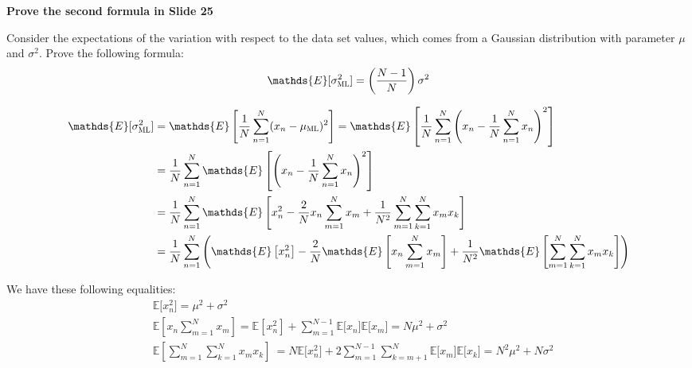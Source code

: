 \documentclass[12pt,twoside]{article}
\begin{document}
\begin{exercises}

\problem \textbf{Prove the second formula in Slide 25}

Consider the expectations of the variation with respect to the data
set values, which comes from a Gaussian distribution with parameter
$\mu$ and $\sigma^2$. Prove the following formula: 
\hspace*{-1em}
$$\mathds{E}\lbrack\sigma_{\scalebox{0.7}{ML}}^2\rbrack = \left ( \frac{N-1}{N} \right ) \sigma^2 $$

\ifsolution \solution{}
\begin{equation}
  \begin{aligned}
    \mathds{E}\lbrack\sigma_{\scalebox{0.7}{ML}}^2\rbrack 
      &= \mathds{E}\left\lbrack\frac{1}{N}\sum_{n=1}^{N} (x_n - \mu_{\scalebox{0.7}{ML}})^2\right\rbrack
      = \mathds{E}\left\lbrack\frac{1}{N}\sum_{n=1}^{N}\left(x_n-\frac{1}{N}\sum_{n=1}^{N}x_n\right)^2\right\rbrack\\
      &= \frac{1}{N}\sum_{n=1}^{N}\mathds{E}\left\lbrack\left(x_n-\frac{1}{N}\sum_{n=1}^{N}x_n\right)^2\right\rbrack\\ 
      &= \frac{1}{N}\sum_{n=1}^{N}\mathds{E}\left\lbrack x_n^2 - \frac{2}{N}x_n\sum_{m=1}^{N}x_m+\frac{1}{N^2}\sum_{m=1}^{N}\sum_{k=1}^{N}x_m x_k\right\rbrack \\
      &= \frac{1}{N}\sum_{n=1}^{N}\left(\mathds{E}\left\lbrack x_n^2\right\rbrack - \frac{2}{N}\mathds{E}\left\lbrack x_n\sum_{m=1}^{N}x_m\right\rbrack+\frac{1}{N^2}\mathds{E}\left\lbrack\sum_{m=1}^{N}\sum_{k=1}^{N}x_m x_k\right\rbrack\right) \\
  \end{aligned}
\end{equation}

We have these following equalities:
\begin{equation}
  \begin{aligned}
    & \mathds{E}\lbrack x_n^2 \rbrack = \mu^2 + \sigma^2 \\
    & \mathds{E}\left\lbrack x_n\sum_{m=1}^{N}x_m\right\rbrack = 
        \mathds{E}\left\lbrack x_n^2 \right\rbrack + \sum_{m = 1}^{N-1}\mathds{E}\lbrack x_n \rbrack \mathds{E} \lbrack x_m \rbrack = N\mu^2 + \sigma^2 \\
    & \mathds{E}\left\lbrack\sum_{m=1}^{N}\sum_{k=1}^{N}x_m x_k\right\rbrack\ = N \mathds{E} \lbrack x_n^2 \rbrack + 2 \sum_{m=1}^{N-1}\sum_{k=m+1}^{N} \mathds{E} \lbrack x_m \rbrack \mathds{E} \lbrack x_k \rbrack = N^2\mu^2 + N\sigma^2\\
  \end{aligned}
\end{equation}


\end{exercises}
\end{document}
